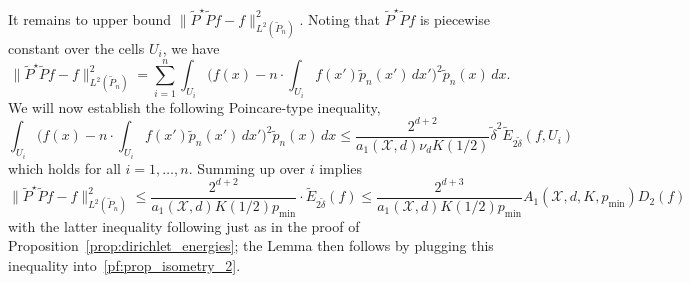 \documentclass{article}
\newcommand{\1}{\mathbf{1}}
\newcommand{\Xset}{\mathcal{X}}
\newcommand{\Leb}{L}
\newcommand{\wt}[1]{\widetilde{#1}}
\theoremstyle{alden}
\theoremstyle{aldenthm}
\theoremstyle{definition}
\theoremstyle{remark}
\begin{document}
It remains to upper bound $\bigl\|\wt{P}^{\star}\wt{P}f - f\bigr\|_{\Leb^2(\wt{P}_n)}^2$. Noting that $\wt{P}^{\star}\wt{P}f$ is piecewise constant over the cells $U_i$, we have
\begin{equation*}
\bigl\|\wt{P}^{\star}\wt{P}f - f\bigr\|_{\Leb^2(\wt{P}_n)}^2 = \sum_{i = 1}^{n} \int_{U_i} \biggl(f(x) - n\cdot\int_{U_i} f(x') \wt{p}_n(x') \,dx'\biggr)^2 \wt{p}_n(x) \,dx.
\end{equation*}
We will now establish the following Poincare-type inequality, 
\begin{equation}
\label{pf:prop_isometry_3}
\int_{U_i} \biggl(f(x) - n\cdot\int_{U_i} f(x') \wt{p}_n(x') \,dx'\biggr)^2 \wt{p}_n(x) \,dx \leq \frac{2^{d + 2}}{a_1(\Xset,d) \nu_d K(1/2)} \wt{\delta}^2 \wt{E}_{2\wt{\delta}}(f,U_i)
\end{equation}
which holds for all $i = 1,\ldots,n$. Summing up over $i$ implies
\begin{equation*}
\bigl\|\wt{P}^{\star}\wt{P}f - f\bigr\|_{\Leb^2(\wt{P}_n)}^2 \leq \frac{2^{d+2}}{a_1(\Xset,d)K(1/2)p_{\min}} \cdot \wt{E}_{2\wt{\delta}}(f) \leq \frac{2^{d+3}}{a_1(\Xset,d)K(1/2)p_{\min}} A_1(\Xset,d,K,p_{\min}) D_2(f)
\end{equation*}
with the latter inequality following just as in the proof of Proposition~\ref{prop:dirichlet_energies}; the Lemma then follows by plugging this inequality into~\eqref{pf:prop_isometry_2}.
\end{document}
